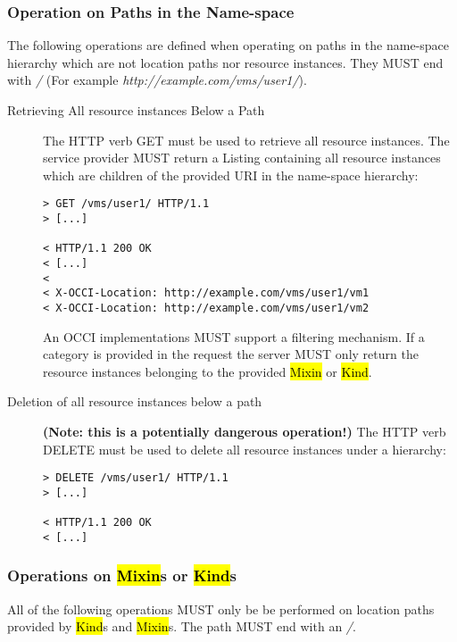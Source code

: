 \documentclass[10pt,a4paper]{article}
\begin{document}
\subsubsection{Operation on Paths in the Name-space}
The following operations are defined when operating on paths in the
name-space hierarchy which are not location paths nor resource
instances. They MUST end with \emph{/} (For example
\emph{http://example.com/vms/user1/}).

\begin{description}
\item[Retrieving All resource instances Below a Path] The HTTP verb
  GET must be used to retrieve all resource instances. The service
  provider MUST return a Listing containing all resource instances
  which are children of the provided URI in the name-space hierarchy:
\begin{verbatim}
> GET /vms/user1/ HTTP/1.1
> [...]
 
< HTTP/1.1 200 OK
< [...]
< 
< X-OCCI-Location: http://example.com/vms/user1/vm1
< X-OCCI-Location: http://example.com/vms/user1/vm2
\end{verbatim}
An OCCI implementations MUST support a filtering mechanism. If a
category is provided in the request the server MUST only return the
resource instances belonging to the provided \hl{Mixin} or \hl{Kind}.

\item[Deletion of all resource instances below a path] \textbf{(Note:
  this is a potentially dangerous operation!)} The HTTP verb DELETE
  must be used to delete all resource instances under a hierarchy:
\begin{verbatim}
> DELETE /vms/user1/ HTTP/1.1
> [...]
 
< HTTP/1.1 200 OK
< [...]
\end{verbatim}
\end{description}

\subsubsection{Operations on \hl{Mixin}s or \hl{Kind}s}
All of the following operations MUST only be be performed on location
paths provided by \hl{Kind}s and \hl{Mixin}s. The path MUST end with
an \emph{/}.
\end{document}
